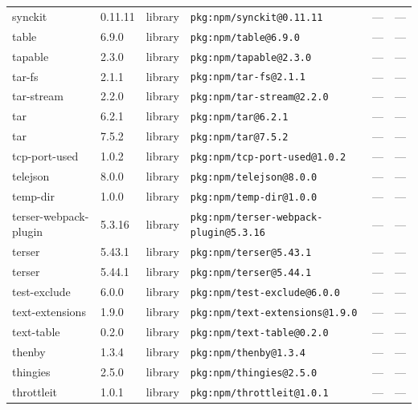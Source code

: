 \documentclass[11pt,a4paper]{article}
\begin{document}
\begin{longtable}{|p{4cm}|p{2cm}|p{1.6cm}|p{5cm}|p{1.5cm}|p{3.5cm}|}
\raggedright synckit & 0.11.11 & library & \small\texttt{pkg:npm/synckit@0.11.11} & — & \small — \\
\raggedright table & 6.9.0 & library & \small\texttt{pkg:npm/table@6.9.0} & — & \small — \\
\raggedright tapable & 2.3.0 & library & \small\texttt{pkg:npm/tapable@2.3.0} & — & \small — \\
\raggedright tar-fs & 2.1.1 & library & \small\texttt{pkg:npm/tar-fs@2.1.1} & — & \small — \\
\raggedright tar-stream & 2.2.0 & library & \small\texttt{pkg:npm/tar-stream@2.2.0} & — & \small — \\
\raggedright tar & 6.2.1 & library & \small\texttt{pkg:npm/tar@6.2.1} & — & \small — \\
\raggedright tar & 7.5.2 & library & \small\texttt{pkg:npm/tar@7.5.2} & — & \small — \\
\raggedright tcp-port-used & 1.0.2 & library & \small\texttt{pkg:npm/tcp-port-used@1.0.2} & — & \small — \\
\raggedright telejson & 8.0.0 & library & \small\texttt{pkg:npm/telejson@8.0.0} & — & \small — \\
\raggedright temp-dir & 1.0.0 & library & \small\texttt{pkg:npm/temp-dir@1.0.0} & — & \small — \\
\raggedright terser-webpack-plugin & 5.3.16 & library & \small\texttt{pkg:npm/terser-webpack-plugin@5.3.16} & — & \small — \\
\raggedright terser & 5.43.1 & library & \small\texttt{pkg:npm/terser@5.43.1} & — & \small — \\
\raggedright terser & 5.44.1 & library & \small\texttt{pkg:npm/terser@5.44.1} & — & \small — \\
\raggedright test-exclude & 6.0.0 & library & \small\texttt{pkg:npm/test-exclude@6.0.0} & — & \small — \\
\raggedright text-extensions & 1.9.0 & library & \small\texttt{pkg:npm/text-extensions@1.9.0} & — & \small — \\
\raggedright text-table & 0.2.0 & library & \small\texttt{pkg:npm/text-table@0.2.0} & — & \small — \\
\raggedright thenby & 1.3.4 & library & \small\texttt{pkg:npm/thenby@1.3.4} & — & \small — \\
\raggedright thingies & 2.5.0 & library & \small\texttt{pkg:npm/thingies@2.5.0} & — & \small — \\
\raggedright throttleit & 1.0.1 & library & \small\texttt{pkg:npm/throttleit@1.0.1} & — & \small — \\

\end{longtable}
\end{document}
